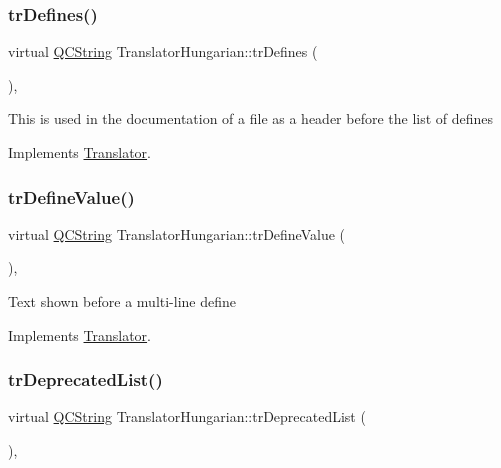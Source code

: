 \subsubsection{\texorpdfstring{trDefines()}{trDefines()}}
{\footnotesize\ttfamily virtual \mbox{\hyperlink{class_q_c_string}{Q\+C\+String}} Translator\+Hungarian\+::tr\+Defines (\begin{DoxyParamCaption}{ }\end{DoxyParamCaption})\hspace{0.3cm}{\ttfamily [inline]}, {\ttfamily [virtual]}}

This is used in the documentation of a file as a header before the list of defines 

Implements \mbox{\hyperlink{class_translator}{Translator}}.

\mbox{\label{class_translator_hungarian_a33706fd1bba9650d760a1a9bba4ce964}} 
\subsubsection{\texorpdfstring{trDefineValue()}{trDefineValue()}}
{\footnotesize\ttfamily virtual \mbox{\hyperlink{class_q_c_string}{Q\+C\+String}} Translator\+Hungarian\+::tr\+Define\+Value (\begin{DoxyParamCaption}{ }\end{DoxyParamCaption})\hspace{0.3cm}{\ttfamily [inline]}, {\ttfamily [virtual]}}

Text shown before a multi-\/line define 

Implements \mbox{\hyperlink{class_translator}{Translator}}.

\mbox{\label{class_translator_hungarian_a43fcc17bf6e6776402aae2699308b473}} 
\subsubsection{\texorpdfstring{trDeprecatedList()}{trDeprecatedList()}}
{\footnotesize\ttfamily virtual \mbox{\hyperlink{class_q_c_string}{Q\+C\+String}} Translator\+Hungarian\+::tr\+Deprecated\+List (\begin{DoxyParamCaption}{ }\end{DoxyParamCaption})\hspace{0.3cm}{\ttfamily [inline]}, {\ttfamily [virtual]}}

